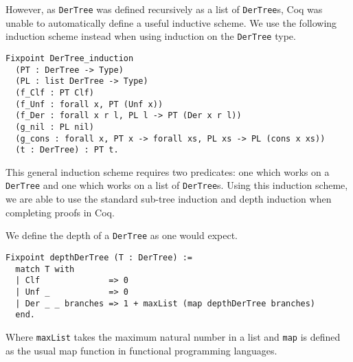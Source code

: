 \documentclass{llncs}
\newcommand{\comment}[1]{}
\begin{document}
However, as \verb+DerTree+ was defined recursively as a list of
\verb+DerTree+s, Coq was unable to automatically define a useful inductive
scheme. We use the following induction scheme instead when using induction on
the \verb+DerTree+ type.
%
\begin{verbatim}
Fixpoint DerTree_induction
  (PT : DerTree -> Type)
  (PL : list DerTree -> Type)
  (f_Clf : PT Clf)
  (f_Unf : forall x, PT (Unf x))
  (f_Der : forall x r l, PL l -> PT (Der x r l))
  (g_nil : PL nil)
  (g_cons : forall x, PT x -> forall xs, PL xs -> PL (cons x xs))
  (t : DerTree) : PT t.
\end{verbatim}
%
This general induction scheme requires two predicates: one which works on a
\verb+DerTree+ and one which works on a list of \verb+DerTree+s.
Using this induction scheme, we are able to use the standard sub-tree induction
and depth induction when completing proofs in Coq.
%
\comment{
Using this,
we use the general induction scheme to define induction on the \verb+DerTree+
type as the standard structural induction on a generic rose-tree. That is 
induction where we prove the proposition holds for leaves as the base case, and
for the inductive step we assume that the proposition holds for all elements
of a list of \verb+DerTree+s and prove that it holds for a node with that list
of \verb+DerTree+s as its children.
We also use this induction scheme to define induction on the depth of a
rose-tree. For the base case we prove that the proposition holds for the case
where the \verb+DerTree+ is a leaf node again. For the inductive case we prove
that the proposition holds for a node when assuming that it hold for all
\verb+DerTree+s with depth less than it.
}

We define the depth of a \verb+DerTree+ as one would expect.
%
\begin{verbatim}
Fixpoint depthDerTree (T : DerTree) :=
  match T with
  | Clf              => 0
  | Unf _            => 0
  | Der _ _ branches => 1 + maxList (map depthDerTree branches)
  end.
\end{verbatim}
%
Where \verb+maxList+ takes the maximum natural number in a list and \verb+map+
is defined as the usual map function in functional programming languages.
%
\end{document}
